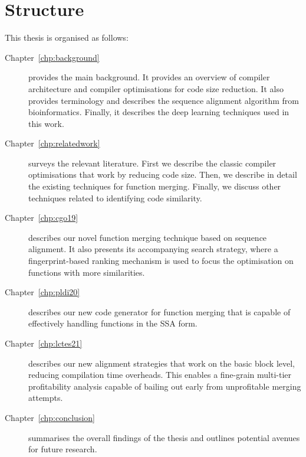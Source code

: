 \section{Structure}

This thesis is organised as follows:
\begin{description}

\item[Chapter~\ref{chp:background}] provides the main background. It provides an overview of compiler architecture and compiler optimisations for code size reduction.
It also provides terminology and describes the sequence alignment algorithm from bioinformatics.
Finally, it describes the deep learning techniques used in this work.

\item[Chapter~\ref{chp:relatedwork}] surveys the relevant literature. First we describe the classic compiler optimisations that work by reducing code size. Then, we describe in detail the existing techniques for function merging. Finally, we discuss other techniques related to identifying code similarity.

\item[Chapter~\ref{chp:cgo19}] describes our novel function merging technique based on sequence alignment.
It also presents its accompanying search strategy, where a fingerprint-based ranking mechanism is used to focus the optimisation on functions with more similarities.

\item[Chapter~\ref{chp:pldi20}] describes our new code generator for function merging that is capable of effectively handling functions in the SSA form.

\item[Chapter~\ref{chp:lctes21}] describes our new alignment strategies that work on the basic block level, reducing compilation time overheads.
This enables a fine-grain multi-tier profitability analysis capable of bailing out early from unprofitable merging attempts.


\item[Chapter~\ref{chp:conclusion}] summarises the overall findings of the thesis and outlines potential avenues for future research.

\end{description}
